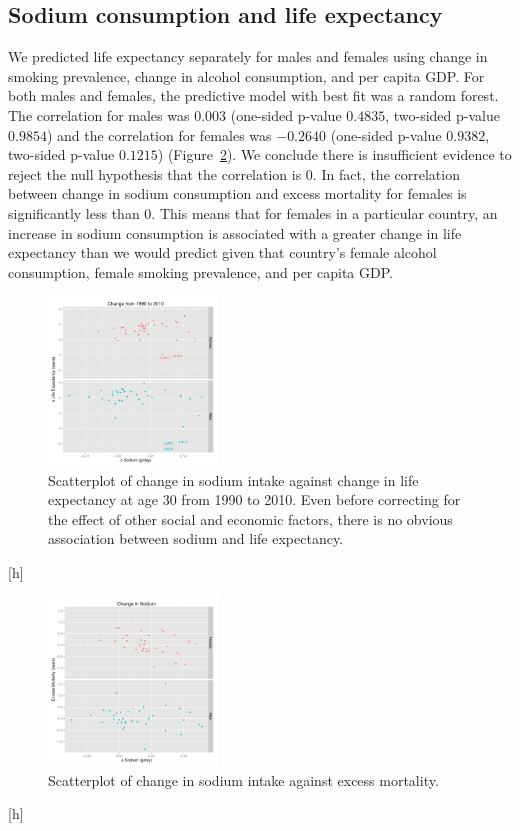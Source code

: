 \documentclass{article}
\begin{document}
\subsection{Sodium consumption and life expectancy}
We predicted life expectancy separately for males and females using change in smoking prevalence, change in alcohol consumption, and per capita GDP.  For both males and females, the predictive model with best fit was a random forest.  The correlation for males was $0.003$ (one-sided p-value $0.4835$, two-sided p-value $0.9854$) and the correlation for females was $-0.2640$ (one-sided p-value $0.9382$, two-sided p-value $0.1215$) (Figure~\ref{fig:sodium_excessmortality}). We conclude there is insufficient evidence to reject the null hypothesis that the correlation is $0$.  In fact, the correlation between change in sodium consumption and excess mortality for females is significantly less than $0$.  This means that for females in a particular country, an increase in sodium consumption is associated with a greater change in life expectancy than we would predict given that country's female alcohol consumption, female smoking prevalence, and per capita GDP. \\



\begin{figure}[h]
\centering
\includegraphics[width = 0.4\textwidth]{plots/sodium_lifeexp.pdf}
\caption{Scatterplot of change in sodium intake against change in life expectancy at age 30 from 1990 to 2010. Even before correcting for the effect of other social and economic factors, there is no obvious association between sodium and life expectancy.}\label{fig:sodium_lifeexp}
\end{figure}[h]

\begin{figure}[h]
\centering
\includegraphics[width = 0.4\textwidth]{plots/sodium_exmort.pdf}
\caption{Scatterplot of change in sodium intake against excess mortality.}\label{fig:sodium_excessmortality}
\end{figure}[h]
\end{document}
